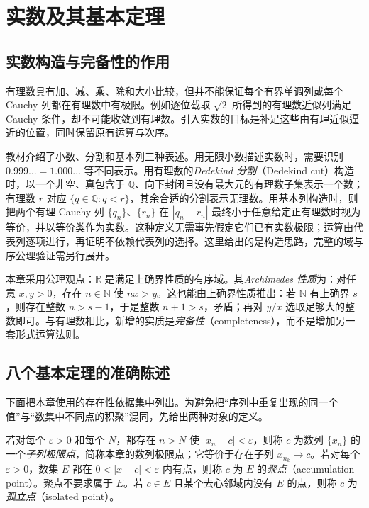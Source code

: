 \section{实数及其基本定理}
\label{sec:pei-real-completeness}

\subsection{实数构造与完备性的作用}

有理数具有加、减、乘、除和大小比较，但并不能保证每个有界单调列或每个 Cauchy 列都在有理数中有极限。例如逐位截取 $\sqrt2$ 所得到的有理数近似列满足 Cauchy 条件，却不可能收敛到有理数。引入实数的目标是补足这些由有理近似逼近的位置，同时保留原有运算与次序。

教材介绍了小数、分割和基本列三种表述。用无限小数描述实数时，需要识别 $0.999\ldots=1.000\ldots$ 等不同表示。用有理数的\emph{Dedekind 分割}（Dedekind cut）构造时，以一个非空、真包含于 $\mathbb{Q}$、向下封闭且没有最大元的有理数子集表示一个数；有理数 $r$ 对应 $\{q\in\mathbb{Q}:q<r\}$，其余合适的分割表示无理数。用基本列构造时，则把两个有理 Cauchy 列 $\{q_n\}$、$\{r_n\}$ 在 $|q_n-r_n|$ 最终小于任意给定正有理数时视为等价，并以等价类作为实数。这种定义无需事先假定它们已有实数极限；运算由代表列逐项进行，再证明不依赖代表列的选择。这里给出的是构造思路，完整的域与序公理验证需另行展开。

本章采用公理观点：$\mathbb{R}$ 是满足上确界性质的有序域。其\emph{Archimedes 性质}为：对任意 $x,y>0$，存在 $n\in\mathbb{N}$ 使 $nx>y$。这也能由上确界性质推出：若 $\mathbb{N}$ 有上确界 $s$，则存在整数 $n>s-1$，于是整数 $n+1>s$，矛盾；再对 $y/x$ 选取足够大的整数即可。与有理数相比，新增的实质是\emph{完备性}（completeness），而不是增加另一套形式运算法则。

\subsection{八个基本定理的准确陈述}

下面把本章使用的存在性依据集中列出。为避免把“序列中重复出现的同一个值”与“数集中不同点的积聚”混同，先给出两种对象的定义。

\begin{definition}
\label{def:pei-cluster-point}
若对每个 $\varepsilon>0$ 和每个 $N$，都存在 $n>N$ 使 $|x_n-c|<\varepsilon$，则称 $c$ 为数列 $\{x_n\}$ 的一个\emph{子列极限点}，简称本章的数列极限点；它等价于存在子列 $x_{n_k}\to c$。若对每个 $\varepsilon>0$，数集 $E$ 都在 $0<|x-c|<\varepsilon$ 内有点，则称 $c$ 为 $E$ 的\emph{聚点}（accumulation point）。聚点不要求属于 $E$。若 $c\in E$ 且某个去心邻域内没有 $E$ 的点，则称 $c$ 为\emph{孤立点}（isolated point）。
\end{definition}

